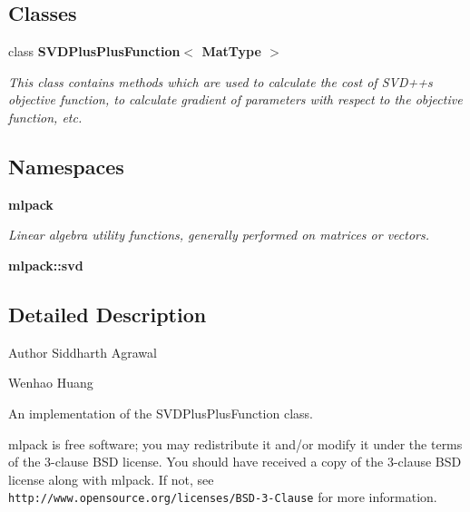 \subsection*{Classes}
\begin{DoxyCompactItemize}
\item 
class \textbf{ S\+V\+D\+Plus\+Plus\+Function$<$ Mat\+Type $>$}
\begin{DoxyCompactList}\small\item\em This class contains methods which are used to calculate the cost of S\+V\+D++\textquotesingle{}s objective function, to calculate gradient of parameters with respect to the objective function, etc. \end{DoxyCompactList}\end{DoxyCompactItemize}
\subsection*{Namespaces}
\begin{DoxyCompactItemize}
\item 
 \textbf{ mlpack}
\begin{DoxyCompactList}\small\item\em Linear algebra utility functions, generally performed on matrices or vectors. \end{DoxyCompactList}\item 
 \textbf{ mlpack\+::svd}
\end{DoxyCompactItemize}


\subsection{Detailed Description}
\begin{DoxyAuthor}{Author}
Siddharth Agrawal 

Wenhao Huang
\end{DoxyAuthor}
An implementation of the S\+V\+D\+Plus\+Plus\+Function class.

mlpack is free software; you may redistribute it and/or modify it under the terms of the 3-\/clause B\+SD license. You should have received a copy of the 3-\/clause B\+SD license along with mlpack. If not, see {\tt http\+://www.\+opensource.\+org/licenses/\+B\+S\+D-\/3-\/\+Clause} for more information. 